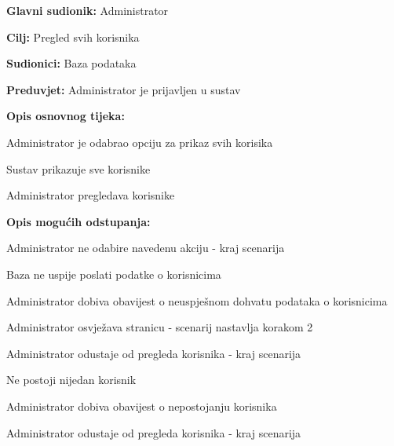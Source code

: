 					\noindent {}
					\begin{packed_item}
	
						\item \textbf{Glavni sudionik: }Administrator
						\item  \textbf{Cilj:} Pregled svih korisnika
						\item  \textbf{Sudionici:} Baza podataka
						\item  \textbf{Preduvjet:} Administrator je prijavljen u sustav
						\item  \textbf{Opis osnovnog tijeka:}
						
						\item[] \begin{packed_enum}
							\item Administrator je odabrao opciju za prikaz svih korisika
							\item Sustav prikazuje sve korisnike
							\item Administrator pregledava korisnike
						\end{packed_enum}
						\item  \textbf{Opis mogućih odstupanja:}

						\item[] \begin{packed_item}
							\item[1.a] Administrator ne odabire navedenu akciju - kraj scenarija
							\item[2.a] Baza ne uspije poslati podatke o korisnicima
							\item[] \begin{packed_enum}
								
								\item Administrator dobiva obavijest o neuspješnom dohvatu podataka o korisnicima
								\item
									\begin{packed_enum}
										\item Administrator osvježava stranicu - scenarij nastavlja korakom 2
										\item Administrator odustaje od pregleda korisnika - kraj scenarija
									\end{packed_enum}
							
							\end{packed_enum}	
							\item[2.b] Ne postoji nijedan korisnik
							\item[] \begin{packed_enum}
								
								\item Administrator dobiva obavijest o nepostojanju korisnika
								\item Administrator odustaje od pregleda korisnika - kraj scenarija
							
							\end{packed_enum}
						\end{packed_item}	
					\end{packed_item}
					
